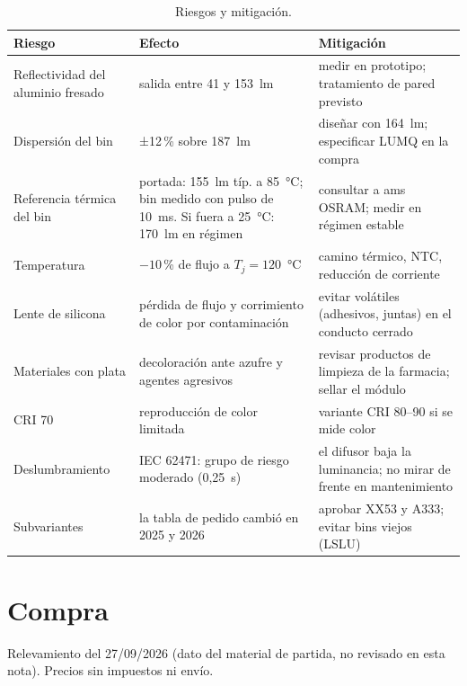 \documentclass[11pt,a4paper]{article}
\begin{document}
\begin{table}[H]\centering\footnotesize
\begin{tabular}{p{3.6cm} p{5.0cm} p{5.4cm}}
\toprule
Riesgo & Efecto & Mitigación\\
\midrule
Reflectividad del aluminio fresado & salida entre 41 y 153~lm & medir en prototipo; tratamiento de pared previsto\\
Dispersión del bin & ±12\,\% sobre 187~lm & diseñar con 164~lm; especificar LUMQ en la compra\\
Referencia térmica del bin & portada: 155~lm típ. a 85~°C; bin medido con pulso de 10~ms. Si fuera a 25~°C: 170~lm en régimen & consultar a ams OSRAM; medir en régimen estable\\
Temperatura & $-10$\,\% de flujo a $T_j = 120$~°C & camino térmico, NTC, reducción de corriente\\
Lente de silicona & pérdida de flujo y corrimiento de color por contaminación & evitar volátiles (adhesivos, juntas) en el conducto cerrado\\
Materiales con plata & decoloración ante azufre y agentes agresivos & revisar productos de limpieza de la farmacia; sellar el módulo\\
CRI 70 & reproducción de color limitada & variante CRI 80--90 si se mide color\\
Deslumbramiento & IEC 62471: grupo de riesgo moderado (0,25~s) & el difusor baja la luminancia; no mirar de frente en mantenimiento\\
Subvariantes & la tabla de pedido cambió en 2025 y 2026 & aprobar XX53 y A333; evitar bins viejos (LSLU)\\
\bottomrule
\end{tabular}
\caption{Riesgos y mitigación.}
\end{table}


\section{Compra}
Relevamiento del 27/09/2026 (dato del material de partida, no revisado en esta nota). Precios sin impuestos ni
envío.
\end{document}
